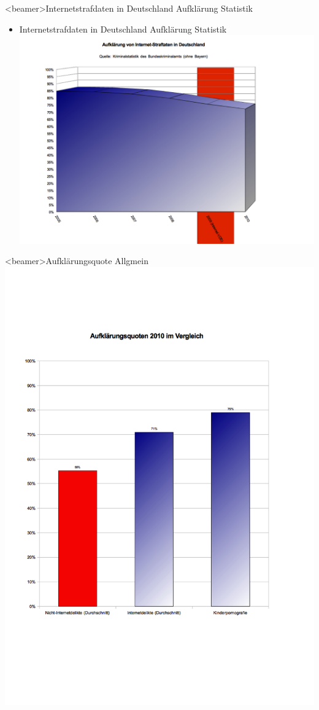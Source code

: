           \begin{frame}<beamer>{Internetstrafdaten in Deutschland Aufklärung Statistik}
\begin{itemize}
        \item Internetstrafdaten in Deutschland Aufklärung Statistik
        \includegraphics[height=1\textheight]{sections/img/aufklaerung_internetdelikte_DE.png}
    \end{itemize}
    \end{frame}
              \begin{frame}<beamer>{Aufklärungsquote Allgmein}
        \includegraphics[height=1.25\textheight]{sections/img/aufklaerung.png}
      \end{frame}
